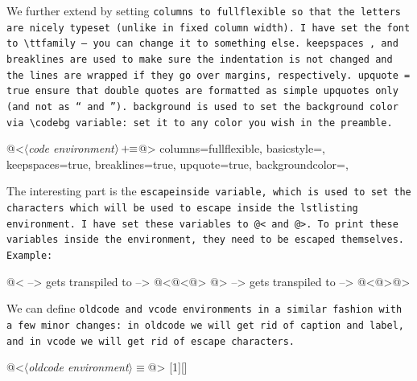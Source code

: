 
We further extend  by setting \tt columns \rm to \tt fullflexible \rm so that the letters
are nicely typeset (unlike in \tt fixed \rm column width). I have set the font to \verb|\ttfamily| --- you can
change it to something else. \tt keepspaces \rm, and \tt breaklines \rm are used to make sure the indentation
is not changed and the lines are wrapped if they go over margins, respectively. \tt upquote = true \rm ensure
that double quotes are formatted as simple upquotes only (and not as `` and ''). \tt background \rm is used to
set the background color via \verb|\codebg| variable: set it to any color you wish in the preamble.

\begin{oldcode}
@<$\langle$\textit{code environment}$\rangle \thinspace +\!\!\equiv$@>
        columns=fullflexible,
        basicstyle=\litcodefont,
        keepspaces=true,
        breaklines=true,
        upquote=true,
        backgroundcolor=\color{\codebg},
\end{oldcode}

The interesting part is the \tt escapeinside \rm variable, which is used to set the characters which will be
used to escape inside the \tt lstlisting \rm environment. I have set these variables to \verb|@<| and
\verb|@>|. To print these variables inside the environment, they need to be escaped themselves. Example:

\begin{vcode}
@< --> gets transpiled to --> @<@<@>
@> --> gets transpiled to --> @<@>@>
\end{vcode}

\begin{oldcode}
@<$\langle$\textit{code environment}$\rangle \thinspace +\!\!\equiv$@>
        escapeinside={@<@<@>}{@<@>@>}
    }
}{}

\end{oldcode}

We can define \tt oldcode \rm and \tt vcode \rm environments in a similar fashion with a few minor changes: in
\tt oldcode \rm we will get rid of caption and label, and in \tt vcode \rm we will get rid of escape
characters.

\begin{code}
@<$\langle$\textit{oldcode environment}$\rangle\equiv$@>
[1][]{
}{}
\end{code}

